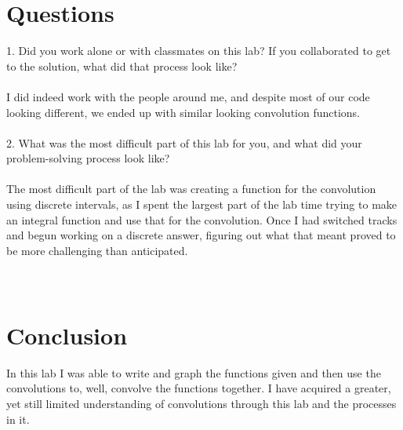 \documentclass[12pt,a4paper]{article}
\begin{document}
\section{Questions} 
1. Did you work alone or with classmates on this lab? If you collaborated to get to the solution,
what did that process look like? \\
\\
I did indeed work with the people around me, and despite most of our code looking different, we ended up with similar looking convolution functions. \\
\\
2. What was the most difficult part of this lab for you, and what did your problem-solving
process look like? \\ 
\\
The most difficult part of the lab was creating a function for the convolution using discrete intervals, as I spent the largest part of the lab time trying to make an integral function and use that for the convolution. Once I had switched tracks and begun working on a discrete answer, figuring out what that meant proved to be more challenging than anticipated. \\
\\
\hline \\
\section {Conclusion}
In this lab I was able to write and graph the functions given and then use the convolutions to, well, convolve the functions together. I have acquired a greater, yet still limited understanding of convolutions through this lab and the processes in it. 
\end{document}
